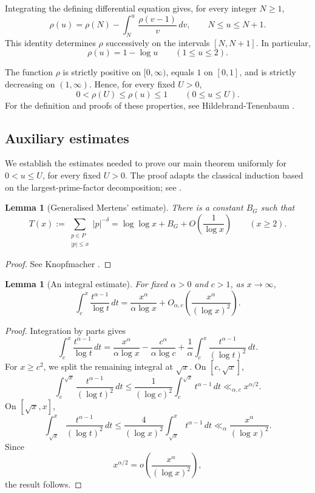 \documentclass[10pt,a4paper]{amsart}
\newtheorem{lemma}[theorem]{Lemma}
\begin{document}
Integrating the defining differential equation gives,
for every integer $N\ge1$,
\begin{equation}\label{rho-recursion}
\rho(u)
=
\rho(N)-\int_N^u\frac{\rho(v-1)}{v}\,dv,
\qquad N\le u\le N+1.
\end{equation}
This identity determines $\rho$ successively on the
intervals $[N,N+1]$. In particular,
\[
\rho(u)=1-\log u\qquad(1\le u\le2).
\]

The function $\rho$ is strictly positive on $[0,\infty)$,
equals $1$ on $[0,1]$, and is strictly decreasing on
$(1,\infty)$. Hence, for every fixed $U>0$,
\[0<\rho(U)\le\rho(u)\le1
\qquad(0\le u\le U).\]
For the definition and proofs of these properties, see
Hildebrand-Tenenbaum
\cite[equations (1.5)-(1.6), p. 414,
and Lemma 2.5, p. 426]{hildebrand1993integers}.


\subsection{Auxiliary estimates}

We establish the estimates needed to prove our main theorem
uniformly for $0<u\le U$, for every fixed $U>0$.
The proof adapts the classical induction based on the
largest-prime-factor decomposition; see
\cite[Section 1, p. 416]{hildebrand1993integers}.


\begin{lemma}[Generalised Mertens' estimate]\label{lem:mertens}
There is a constant $B_G$ such that
\[
T(x):=\sum_{\substack{p\in P\\|p|\le x}}|p|^{-\delta}
=
\log\log x+B_G
+O\!\left(\frac1{\log x}\right)
\qquad(x\ge2).
\]
\end{lemma}

\begin{proof}
See Knopfmacher
\cite[Chapter VI, Lemma 2.5]{knopfmacher2015abstract}.
\end{proof}

\begin{lemma}[An integral estimate]\label{lem:integral}
For fixed $\alpha>0$ and $c>1$, as $x\to\infty$,
\[
\int_c^x\frac{t^{\alpha-1}}{\log t}\,dt
=
\frac{x^\alpha}{\alpha\log x}
+
O_{\alpha,c}\!\left(
\frac{x^\alpha}{(\log x)^2}
\right).
\]
\end{lemma}

\begin{proof}
Integration by parts gives
\[
\int_c^x\frac{t^{\alpha-1}}{\log t}\,dt
=
\frac{x^\alpha}{\alpha\log x}
-\frac{c^\alpha}{\alpha\log c}
+\frac1\alpha
\int_c^x\frac{t^{\alpha-1}}{(\log t)^2}\,dt.
\]
For $x\ge c^2$, we split the remaining integral at $\sqrt{x}$.
On $[c,\sqrt{x}]$,
\[
\int_c^{\sqrt{x}}
\frac{t^{\alpha-1}}{(\log t)^2}\,dt
\le
\frac1{(\log c)^2}
\int_c^{\sqrt{x}}t^{\alpha-1}\,dt
\ll_{\alpha,c}x^{\alpha/2}.
\]
On $[\sqrt{x},x]$,
\[
\int_{\sqrt{x}}^x
\frac{t^{\alpha-1}}{(\log t)^2}\,dt
\le
\frac4{(\log x)^2}
\int_{\sqrt{x}}^x t^{\alpha-1}\,dt
\ll_\alpha\frac{x^\alpha}{(\log x)^2}.
\]
Since
\[
x^{\alpha/2}
=o\!\left(\frac{x^\alpha}{(\log x)^2}\right),
\]
the result follows.
\end{proof}
\end{document}
